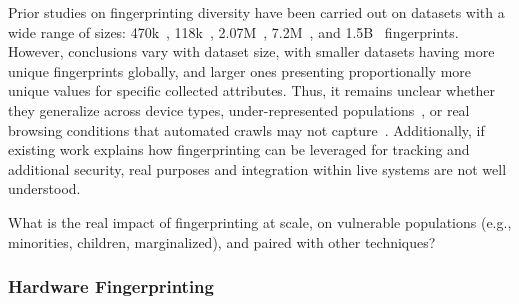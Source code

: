 Prior studies on fingerprinting diversity have been carried out on datasets with a wide range of sizes: 470k~\cite{eckersleyHowUniqueYour2010}, 118k~\cite{laperdrixBeautyBeastDiverting2016}, 2.07M~\cite{gomez-boixHidingCrowdAnalysis2018}, 7.2M~\cite{liWhoTouchedMy2020}, and 1.5B~\cite{wuHimManyFaces2023} fingerprints. 
%
However, conclusions vary with dataset size, with smaller datasets having more unique fingerprints globally, and larger ones presenting proportionally more unique values for specific collected attributes.
%
Thus, it remains unclear whether they generalize across device types, under-represented populations~\cite{berkeHowUniqueWhose2025,pradeepNotYourAverage2023}, or real browsing conditions that automated crawls may not capture~\cite{muthu2025beyond,deuserBrowsingUnicityLimits2020}. 
%
Additionally, if existing work explains how fingerprinting can be leveraged for tracking and additional security, real purposes and integration within live systems are not well understood.

\begin{opbox}
What is the real impact of fingerprinting at scale, on vulnerable populations (e.g., minorities, children, marginalized), and paired with other techniques?
\end{opbox}


\subsubsection{Hardware Fingerprinting} 
\label{sec:stateless-techniques-hardware-fingperinting}

